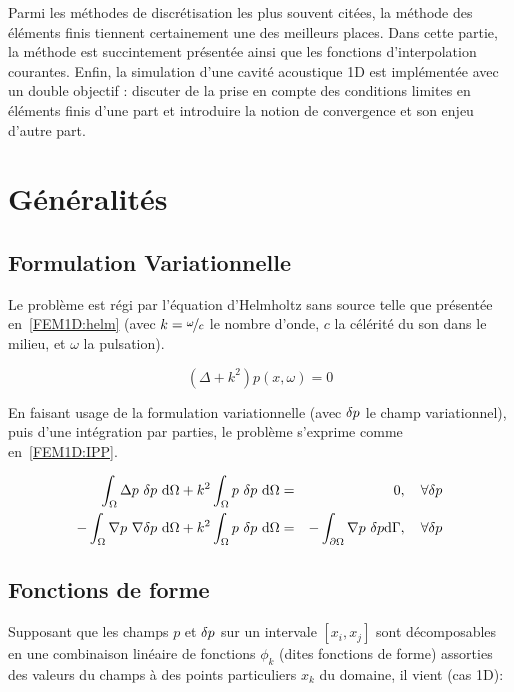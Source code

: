 Parmi les méthodes de discrétisation les plus souvent citées, la méthode des éléments finis tiennent certainement une
des meilleurs places. Dans cette partie, la méthode est succintement présentée ainsi que les fonctions d'interpolation
courantes. Enfin, la simulation d'une cavité acoustique 1D est implémentée avec un double objectif : discuter de la
prise en compte des conditions limites en éléments finis d'une part et introduire la notion de convergence et son
enjeu d'autre part.

\section{Généralités}
\label{FEM1D:subsection:linear}

\subsection{Formulation Variationnelle}

Le problème est régi par l'équation d'Helmholtz sans source telle que présentée en~\eqref{FEM1D:helm} (avec $k =
\nicefrac{\omega}{c}$ le nombre d'onde, $c$ la célérité du son dans le milieu, et $\omega$ la pulsation).

\begin{equation}
	(\Delta + k^2)p(x,\omega) = 0 \label{FEM1D:helm}
\end{equation}

En faisant usage de la formulation variationnelle (avec $\delta p$ le champ variationnel), puis d'une intégration par
parties, le problème s'exprime comme en~\eqref{FEM1D:IPP}.

\begin{eqnarray}
	\int_\Omega \Delta p~\delta p~\mathrm{d}\Omega + k^2 \int_\Omega p~\delta p~\mathrm{d}\Omega & =  & 0,\quad \forall\delta p\notag\\
	- \int_\Omega \nabla p~\nabla \delta p ~\mathrm{d}\Omega + k^2\int_\Omega p~\delta p~\mathrm{d}\Omega & = & -\int_{\partial\Omega}\nabla p~\delta p\mathrm{d}\Gamma, \quad \forall\delta p \label{FEM1D:IPP}
\end{eqnarray}

\subsection{Fonctions de forme}

Supposant que les champs $p$ et $\delta p$ sur un intervale $[x_i, x_j]$ sont décomposables en une combinaison linéaire de
fonctions $\phi_k$ (dites fonctions de forme) assorties des valeurs du champs à des points particuliers $x_k$ du domaine, il
vient (cas 1D):

